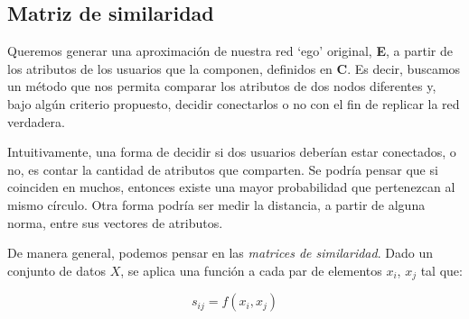 
\vspace{2em}
\subsection{Matriz de similaridad}


Queremos generar una aproximación de nuestra red `ego' original, \textbf{E}, a partir de los atributos de los usuarios que la componen, definidos en \textbf{C}. Es decir, buscamos un método que nos permita comparar los atributos de dos nodos diferentes y, bajo algún criterio propuesto, decidir conectarlos o no con el fin de replicar la red verdadera. 


\vspace{1em}
Intuitivamente, una forma de decidir si dos usuarios deberían estar conectados, o no, es contar la cantidad de atributos que comparten. Se podría pensar que si coinciden en muchos, entonces existe una mayor probabilidad que pertenezcan al mismo círculo. Otra forma podría ser medir la distancia, a partir de alguna norma, entre sus vectores de atributos.%

De manera general, podemos pensar en las \textit{matrices de similaridad}. Dado un conjunto de datos $X$, se aplica una función a cada par de elementos $x_i$, $x_j$ tal que:

\vspace{1em}
\begin{equation}
    s_{ij} = f(x_i, x_j)
\end{equation}

